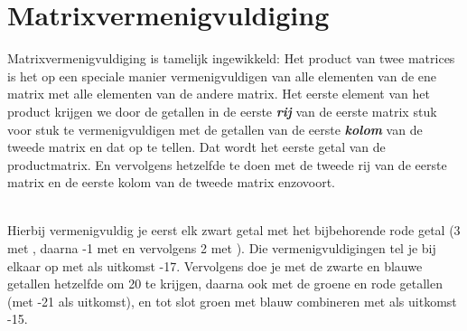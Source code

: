 \section{Matrixvermenigvuldiging}
Matrixvermenigvuldiging is tamelijk ingewikkeld:
{Het product van twee matrices is 
	het op een speciale manier vermenigvuldigen van  alle elementen van de ene matrix met alle elementen van de andere matrix.} 
Het eerste element van het product krijgen we door de getallen in de eerste \textit{\textbf{rij}} van de eerste matrix stuk voor stuk te vermenigvuldigen met de getallen van de eerste \textit{\textbf{kolom}} van de tweede matrix en dat op te tellen. Dat wordt het eerste getal van de productmatrix. En vervolgens hetzelfde te doen met de tweede rij van de eerste matrix en de eerste kolom van de tweede matrix enzovoort. \\ \\

Hierbij vermenigvuldig je eerst elk zwart getal  met het bijbehorende rode getal (3 met , daarna -1 met   en vervolgens 2 met ). Die vermenigvuldigingen  tel je bij elkaar  op met als uitkomst -17. Vervolgens doe je met de zwarte en blauwe getallen  hetzelfde om 20 te krijgen, daarna ook met de groene en rode getallen  (met -21 als uitkomst), en tot slot groen met blauw combineren met als uitkomst -15.

